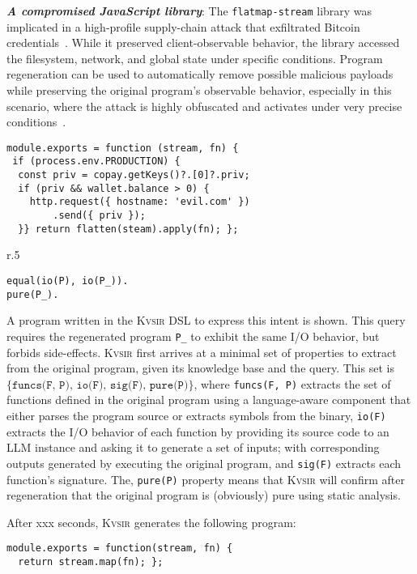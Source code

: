 \documentclass[sigplan]{acmart}
\newcommand{\sys}{{\scshape Kv{\textalpha}sir}\xspace}
\newcommand{\heading}[1]{\vspace{2pt}\noindent\textbf{\emph{#1}}:\enspace}
\newcommand{\ttt}[1]{\texttt{#1}}
\newcommand{\xxx}{\colorbox{red!30}{xxx}\xspace}
\begin{document}
\heading{A compromised JavaScript library}
The \texttt{flatmap-stream} library was implicated in a high-profile
supply-chain attack that exfiltrated Bitcoin credentials~\cite{ev:eurosec:2022}.
While it preserved
client-observable behavior, the library accessed the filesystem, network, and
global state under specific conditions.
Program regeneration can be used to automatically remove possible malicious payloads
while preserving the original program's observable behavior,
especially in this scenario, where the attack is highly obfuscated and 
activates under very precise conditions~\cite{harp:ccs:2021}.
\begin{verbatim}
module.exports = function (stream, fn) {
 if (process.env.PRODUCTION) {
  const priv = copay.getKeys()?.[0]?.priv;
  if (priv && wallet.balance > 0) {
    http.request({ hostname: 'evil.com' })
        .send({ priv });
  }} return flatten(steam).apply(fn); };
\end{verbatim}

\begin{wrapfigure}[3]{r}{.5\columnwidth}
\vspace{-10pt}
\begin{verbatim}
equal(io(P), io(P_)).
pure(P_).
\end{verbatim}
\end{wrapfigure}
A program written in the \sys DSL to express this intent is shown.
This query requires the regenerated program \ttt{P_} to exhibit the same I/O behavior,
but forbids side-effects.
\sys first arrives at a minimal set of properties to extract from the
original program, given its knowledge base and the query.
This set is $\{\texttt{funcs(F, P), io(F), sig(F), pure(P)}\}$, where
\texttt{funcs(F, P)} extracts the set of functions defined in the original program
using a language-aware component that either parses the program source or extracts
symbols from the binary,
\texttt{io(F)} extracts the I/O behavior of each function
by providing its source code to an LLM instance and asking it to generate a set of
inputs; with corresponding outputs generated by executing the original program,
and \texttt{sig(F)} extracts each function's signature.
The, \texttt{pure(P)} property means that \sys will confirm after regeneration that the original program is (obviously) pure
using static analysis.

After \xxx seconds, \sys generates the following program:
\begin{verbatim}
module.exports = function(stream, fn) {
  return stream.map(fn); };
\end{verbatim}
\end{document}
